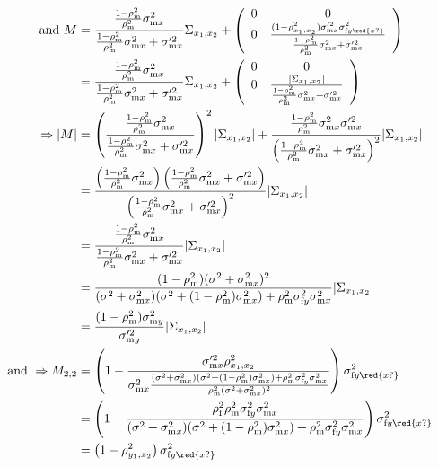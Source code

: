 \documentclass{article}
\newcommand{\x}[1]{\text{#1}}
\begin{document}
\begin{landscape}
\begin{align*}
\end{align*}
\begin{align*}
\text{ and } M&=\frac{\frac{1-\rho_\x{m}^2}{\rho_\x{m}^2}\sigma_{\x{m}x}^2}{\frac{1-\rho_\x{m}^2}{\rho_\x{m}^2}\sigma_{\x{m}x}^2+\sigma_{\x{m}x}'^2}\Sigma_{x_1,x_2}+\left(\begin{array}{cc}0 & 0 \\ 0 & \frac{(1-\rho_{x_1,x_2}^2)\sigma_{\x{m}x}'^2\sigma_{\x{f}y\red{x?}}^2}{\frac{1-\rho_\x{m}^2}{\rho_\x{m}^2}\sigma_{\x{m}x}^2+\sigma_{\x{m}x}'^2} \end{array}\right)
\\&=\frac{\frac{1-\rho_\x{m}^2}{\rho_\x{m}^2}\sigma_{\x{m}x}^2}{\frac{1-\rho_\x{m}^2}{\rho_\x{m}^2}\sigma_{\x{m}x}^2+\sigma_{\x{m}x}'^2}\Sigma_{x_1,x_2}+\left(\begin{array}{cc}0 & 0 \\ 0 & \frac{|\Sigma_{x_1,x_2}|}{\frac{1-\rho_\x{m}^2}{\rho_\x{m}^2}\sigma_{\x{m}x}^2+\sigma_{\x{m}x}'^2} \end{array}\right)
\\ \Rightarrow |M| &=\left(\frac{\frac{1-\rho_\x{m}^2}{\rho_\x{m}^2}\sigma_{\x{m}x}^2}{\frac{1-\rho_\x{m}^2}{\rho_\x{m}^2}\sigma_{\x{m}x}^2+\sigma_{\x{m}x}'^2}\right)^2|\Sigma_{x_1,x_2}|+\frac{\frac{1-\rho_\x{m}^2}{\rho_\x{m}^2}\sigma_{\x{m}x}^2\sigma_{\x{m}x}'^2}{\left(\frac{1-\rho_\x{m}^2}{\rho_\x{m}^2}\sigma_{\x{m}x}^2+\sigma_{\x{m}x}'^2\right)^2}|\Sigma_{x_1,x_2}|
\\&=\frac{\left(\frac{1-\rho_\x{m}^2}{\rho_\x{m}^2}\sigma_{\x{m}x}^2\right)\left(\frac{1-\rho_\x{m}^2}{\rho_\x{m}^2}\sigma_{\x{m}x}^2+\sigma_{\x{m}x}'^2\right)}{\left(\frac{1-\rho_\x{m}^2}{\rho_\x{m}^2}\sigma_{\x{m}x}^2+\sigma_{\x{m}x}'^2\right)^2}|\Sigma_{x_1,x_2}|
\\&=\frac{\frac{1-\rho_\x{m}^2}{\rho_\x{m}^2}\sigma_{\x{m}x}^2}{\frac{1-\rho_\x{m}^2}{\rho_\x{m}^2}\sigma_{\x{m}x}^2+\sigma_{\x{m}x}'^2}|\Sigma_{x_1,x_2}|
\\&=\frac{(1-\rho_\x{m}^2)(\sigma^2+\sigma_{\x{m}x}^2)^2}{(\sigma^2+\sigma_{\x{m}x}^2)(\sigma^2+(1-\rho_\x{m}^2)\sigma_{\x{m}x}^2)+\rho_\x{m}^2\sigma_{\x{f}y}^2\sigma_{\x{m}x}^2}|\Sigma_{x_1,x_2}|
\\&=\frac{(1-\rho_\x{m}^2)\sigma_{\x{m}y}^2}{\sigma_{\x{m}y}'^2}|\Sigma_{x_1,x_2}|
\\\text{ and } \Rightarrow M_{2,2}&=\left(1-\frac{\sigma_{\x{m}x}'^2\rho_{x_1,x_2}^2}{\sigma_{\x{m}x}^2\frac{(\sigma^2+\sigma_{\x{m}x}^2)(\sigma^2+(1-\rho_\x{m}^2)\sigma_{\x{m}x}^2)+\rho_\x{m}^2\sigma_{\x{f}y}^2\sigma_{\x{m}x}^2}{\rho_\x{m}^2(\sigma^2+\sigma_{\x{m}x}^2)^2}}\right)\sigma_{\x{f}y\red{x?}}^2
\\&=\left(1-\frac{\rho_\x{f}^2\rho_\x{m}^2\sigma_{\x{f}y}^2\sigma_{\x{m}x}^2}{(\sigma^2+\sigma_{\x{m}x}^2)(\sigma^2+(1-\rho_\x{m}^2)\sigma_{\x{m}x}^2)+\rho_\x{m}^2\sigma_{\x{f}y}^2\sigma_{\x{m}x}^2}\right)\sigma_{\x{f}y\red{x?}}^2
\\&=\left(1-\rho_{y_1,x_2}^2\right)\sigma_{\x{f}y\red{x?}}^2
\end{align*}


\end{landscape}
\end{document}
